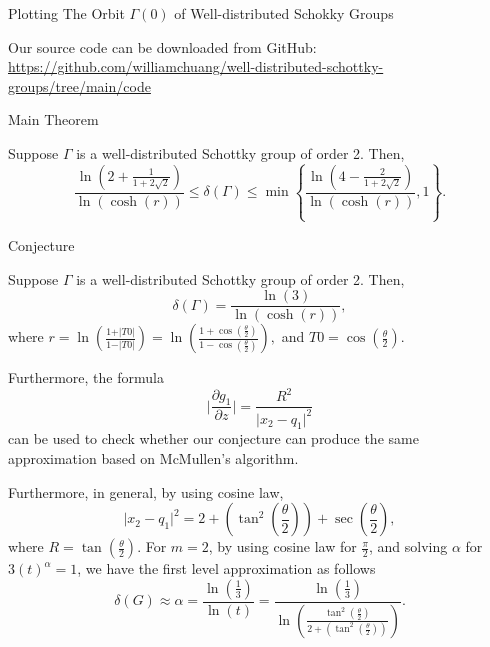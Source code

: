 \documentclass[final]{beamer}
\newlength{\onecolwid}
\begin{document}
\begin{frame}[t]
\begin{columns}[t]
\begin{column}{\onecolwid}
\begin{block}{Plotting The Orbit $\Gamma(0)$ of Well-distributed Schokky Groups}
\begin{multicols}{3}
\end{multicols}
\begin{scriptsize}
Our source code can be downloaded from GitHub: \newline
 \url{https://github.com/williamchuang/well-distributed-schottky-groups/tree/main/code}
\end{scriptsize}
\end{block}





\begin{alertblock}{Main Theorem}
\begin{footnotesize}
Suppose $\Gamma$ is a well-distributed Schottky group of order 2. Then, 
$$
\frac{\ln\left( 2+\frac{1}{1+2\sqrt{2}}\right)}{\ln\left(\cosh\left(r\right)\right)}\leq \delta\left(\Gamma\right)\leq
\min\left\lbrace \frac{\ln\left(4-\frac{2}{1+2\sqrt{2}}\right)}{\ln\left(\cosh\left(r\right)\right)},1\right\rbrace.
$$
\end{footnotesize}
\end{alertblock}
\begin{alertblock}{Conjecture}
\begin{footnotesize}
Suppose $\Gamma$ is a well-distributed Schottky group of order 2. Then, 
$$
\delta(\Gamma)=\frac{\ln\left( 3\right)}{\ln\left( \cosh\left( r\right)\right)},
$$
where
$
r=\ln\left(\frac{1+\vert T0\vert}{1-\vert T0 \vert} \right)=\ln\left(\frac{1+\cos\left(\frac{\theta}{2}\right)}{1-\cos\left(\frac{\theta}{2}\right)} \right),$ and $T0=\cos\left(\frac{\theta}{2}\right).$
\end{footnotesize}
\end{alertblock}




\begin{scriptsize}
Furthermore, the formula
$$
\bigg|\frac{\partial g_1}{\partial z}\bigg|=\frac{R^2}{\vert x_2-q_1\vert^2}
$$
can be used to check whether our conjecture can produce the same approximation based on McMullen's algorithm.

Furthermore, in general, by using cosine law, 
$$
\vert x_2-q_1\vert^2=2+\left(\tan^2\left(\frac{\theta}{2}\right)\right)+\sec\left(\frac{\theta}{2}\right),
$$
where $R=\tan\left(\frac{\theta}{2}\right)$. For $m=2$, by using cosine law for $\frac{\pi}{2}$, and solving $\alpha$ for $3(t)^\alpha=1$, we have the first level approximation as follows
$$
\delta(G)\approx \alpha=\frac{\ln\left(\frac{1}{3}\right)}{\ln\left(t \right)}
=\frac{\ln\left(\frac{1}{3}\right)}{\ln\left(\frac{\tan^2\left(\frac{\theta}{2}\right)}{2+\left(\tan^2\left(\frac{\theta}{2}\right)\right)} \right)}.
$$
\end{scriptsize}




\end{column}
\end{columns}
\end{frame}
\end{document}
